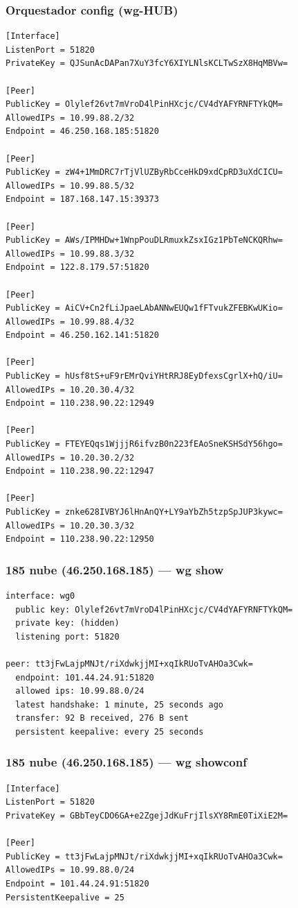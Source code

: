 \documentclass[11pt,a4paper]{article}
\begin{document}
\subsubsection*{Orquestador config (wg-HUB)}
\begin{lstlisting}
[Interface]
ListenPort = 51820
PrivateKey = QJSunAcDAPan7XuY3fcY6XIYLNlsKCLTwSzX8HqMBVw=

[Peer]
PublicKey = Olylef26vt7mVroD4lPinHXcjc/CV4dYAFYRNFTYkQM=
AllowedIPs = 10.99.88.2/32
Endpoint = 46.250.168.185:51820

[Peer]
PublicKey = zW4+1MmDRC7rTjVlUZByRbCceHkD9xdCpRD3uXdCICU=
AllowedIPs = 10.99.88.5/32
Endpoint = 187.168.147.15:39373

[Peer]
PublicKey = AWs/IPMHDw+1WnpPouDLRmuxkZsxIGz1PbTeNCKQRhw=
AllowedIPs = 10.99.88.3/32
Endpoint = 122.8.179.57:51820

[Peer]
PublicKey = AiCV+Cn2fLiJpaeLAbANNwEUQw1fFTvukZFEBKwUKio=
AllowedIPs = 10.99.88.4/32
Endpoint = 46.250.162.141:51820

[Peer]
PublicKey = hUsf8tS+uF9rEMrQviYHtRRJ8EyDfexsCgrlX+hQ/iU=
AllowedIPs = 10.20.30.4/32
Endpoint = 110.238.90.22:12949

[Peer]
PublicKey = FTEYEQqs1WjjjR6ifvzB0n223fEAoSneKSHSdY56hgo=
AllowedIPs = 10.20.30.2/32
Endpoint = 110.238.90.22:12947

[Peer]
PublicKey = znke628IVBYJ6lHnAnQY+LY9aYbZh5tzpSpJUP3kywc=
AllowedIPs = 10.20.30.3/32
Endpoint = 110.238.90.22:12950

\end{lstlisting}

\subsubsection*{185 nube (46.250.168.185) — wg show}
\begin{lstlisting}
interface: wg0
  public key: Olylef26vt7mVroD4lPinHXcjc/CV4dYAFYRNFTYkQM=
  private key: (hidden)
  listening port: 51820

peer: tt3jFwLajpMNJt/riXdwkjjMI+xqIkRUoTvAHOa3Cwk=
  endpoint: 101.44.24.91:51820
  allowed ips: 10.99.88.0/24
  latest handshake: 1 minute, 25 seconds ago
  transfer: 92 B received, 276 B sent
  persistent keepalive: every 25 seconds

\end{lstlisting}

\subsubsection*{185 nube (46.250.168.185) — wg showconf}
\begin{lstlisting}
[Interface]
ListenPort = 51820
PrivateKey = GBbTeyCDO6GA+e2ZgejJdKuFrjIlsXY8RmE0TiXiE2M=

[Peer]
PublicKey = tt3jFwLajpMNJt/riXdwkjjMI+xqIkRUoTvAHOa3Cwk=
AllowedIPs = 10.99.88.0/24
Endpoint = 101.44.24.91:51820
PersistentKeepalive = 25

\end{lstlisting}
\end{document}
